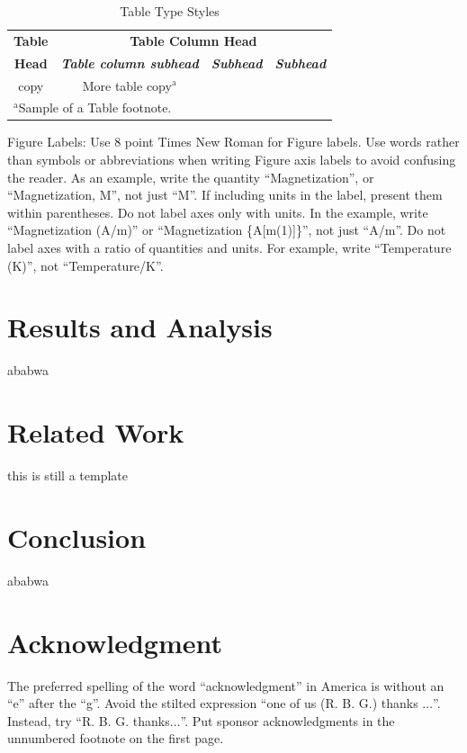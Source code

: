 \documentclass[conference]{IEEEtran}
\begin{document}
\begin{table}[htbp]
\caption{Table Type Styles}
\begin{center}
\begin{tabular}{|c|c|c|c|}
\hline
\textbf{Table}&\multicolumn{3}{|c|}{\textbf{Table Column Head}} \\
\cline{2-4} 
\textbf{Head} & \textbf{\textit{Table column subhead}}& \textbf{\textit{Subhead}}& \textbf{\textit{Subhead}} \\
\hline
copy& More table copy$^{\mathrm{a}}$& &  \\
\hline
\multicolumn{4}{l}{$^{\mathrm{a}}$Sample of a Table footnote.}
\end{tabular}
\label{tab2}
\end{center}
\end{table}

Figure Labels: Use 8 point Times New Roman for Figure labels. Use words 
rather than symbols or abbreviations when writing Figure axis labels to 
avoid confusing the reader. As an example, write the quantity 
``Magnetization'', or ``Magnetization, M'', not just ``M''. If including 
units in the label, present them within parentheses. Do not label axes only 
with units. In the example, write ``Magnetization (A/m)'' or ``Magnetization 
\{A[m(1)]\}'', not just ``A/m''. Do not label axes with a ratio of 
quantities and units. For example, write ``Temperature (K)'', not 
``Temperature/K''.

\section{Results and Analysis}
ababwa

\section{Related Work}
this is still a template

\section{Conclusion}
ababwa

\section*{Acknowledgment}

The preferred spelling of the word ``acknowledgment'' in America is without 
an ``e'' after the ``g''. Avoid the stilted expression ``one of us (R. B. 
G.) thanks $\ldots$''. Instead, try ``R. B. G. thanks$\ldots$''. Put sponsor 
acknowledgments in the unnumbered footnote on the first page.
\end{document}
